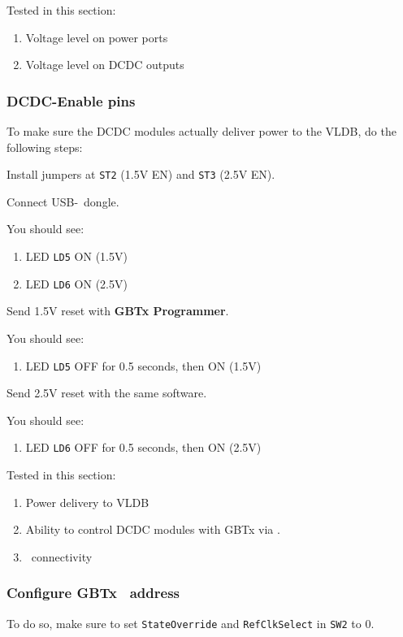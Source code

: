 Tested in this section:
\begin{enumerate}
    \item Voltage level on power ports
    \item Voltage level on DCDC outputs
\end{enumerate}

\subsubsection{DCDC-Enable pins}
To make sure the DCDC modules actually deliver power to the VLDB, do the
following steps:

Install jumpers at \texttt{ST2} (1.5V EN) and \texttt{ST3} (2.5V EN).

Connect USB-\itwoc\ dongle.
\begin{leftbar}
    You should see:
\begin{enumerate}
    \item LED \texttt{LD5} ON (1.5V)
    \item LED \texttt{LD6} ON (2.5V)
\end{enumerate}
\end{leftbar}

Send 1.5V reset with \textbf{GBTx Programmer}.
\begin{leftbar}
    You should see:
\begin{enumerate}
    \item LED \texttt{LD5} OFF for 0.5 seconds, then ON (1.5V)
\end{enumerate}
\end{leftbar}

Send 2.5V reset with the same software.
\begin{leftbar}
    You should see:
\begin{enumerate}
    \item LED \texttt{LD6} OFF for 0.5 seconds, then ON (2.5V)
\end{enumerate}
\end{leftbar}

Tested in this section:
\begin{enumerate}
    \item Power delivery to VLDB
    \item Ability to control DCDC modules with GBTx via \itwoc.
    \item \itwoc\ connectivity
\end{enumerate}


\subsubsection{Configure GBTx \itwoc\ address}
To do so, make sure to set \texttt{StateOverride} and \texttt{RefClkSelect} in
\texttt{SW2} to 0.

